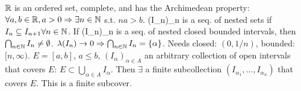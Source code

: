 $\mathbb{R}$ is an ordered set, complete, and has the Archimedean property:
$\forall a, b \in \mathbb{R}, a > 0 \Rightarrow \exists n \in \mathbb{N}$ s.t. $na > b$.
 (I_n)_{n \in \N} is a seq. of nested sets if $I_n \subseteq I_{n+1} \forall n \in \mathbb{N}$.
If (I_n)_{n \in \N} is a seq. of nested closed bounded intervals, then $\bigcap_{n \in \mathbb{N}} I_n \neq \emptyset$.
$\lambda(I_n) \to 0 \Rightarrow \bigcap_{n \in \mathbb{N}} I_n = \{\alpha\}$.
Needs closed: $(0, 1/n)$, bounded: $[n, \infty)$.
 $E = [a, b]$, $a \le b$, $(I_\alpha)_{\alpha \in A}$ an arbitrary collection
of open intervals that covers $E$: $E \subset \bigcup_{\alpha \in A} I_\alpha$.
Then $\exists$ a finite subcollection $(I_{\alpha_1}, \dots, I_{\alpha_n})$
that covers $E$. This is a finite subcover.
